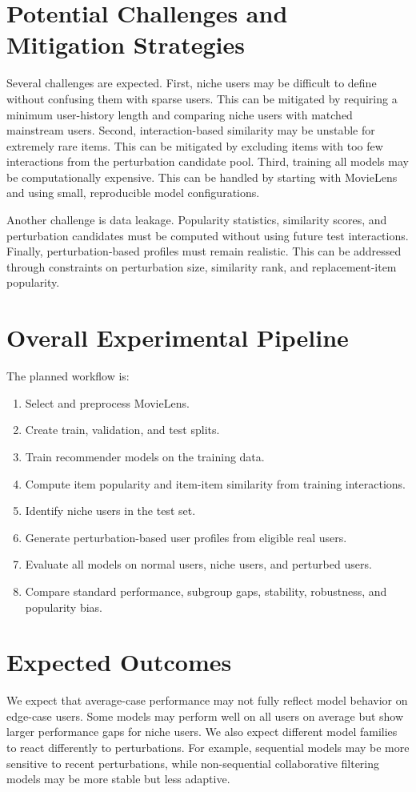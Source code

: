 \documentclass[sigconf]{acmart}
\begin{document}
\section{Potential Challenges and Mitigation Strategies}
Several challenges are expected. First, niche users may be difficult to define without confusing them with sparse users. This can be mitigated by requiring a minimum user-history length and comparing niche users with matched mainstream users. Second, interaction-based similarity may be unstable for extremely rare items. This can be mitigated by excluding items with too few interactions from the perturbation candidate pool. Third, training all models may be computationally expensive. This can be handled by starting with MovieLens and using small, reproducible model configurations.

Another challenge is data leakage. Popularity statistics, similarity scores, and perturbation candidates must be computed without using future test interactions. Finally, perturbation-based profiles must remain realistic. This can be addressed through constraints on perturbation size, similarity rank, and replacement-item popularity.

\section{Overall Experimental Pipeline}
The planned workflow is:

\begin{enumerate}
  \item Select and preprocess MovieLens.
  \item Create train, validation, and test splits.
  \item Train recommender models on the training data.
  \item Compute item popularity and item-item similarity from training interactions.
  \item Identify niche users in the test set.
  \item Generate perturbation-based user profiles from eligible real users.
  \item Evaluate all models on normal users, niche users, and perturbed users.
  \item Compare standard performance, subgroup gaps, stability, robustness, and popularity bias.
\end{enumerate}

\section{Expected Outcomes}
We expect that average-case performance may not fully reflect model behavior on edge-case users. Some models may perform well on all users on average but show larger performance gaps for niche users. We also expect different model families to react differently to perturbations. For example, sequential models may be more sensitive to recent perturbations, while non-sequential collaborative filtering models may be more stable but less adaptive.
\end{document}

